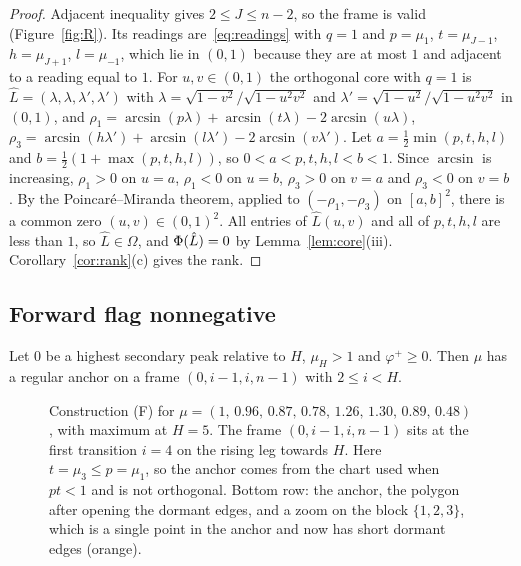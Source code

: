 \begin{proof}
Adjacent inequality gives $2\le J\le n-2$, so the frame is valid
(Figure~\ref{fig:R}). Its readings are~\eqref{eq:readings} with $q=1$ and
$p=\mu_1$, $t=\mu_{J-1}$, $h=\mu_{J+1}$, $l=\mu_{-1}$, which lie in $(0,1)$
because they are at most $1$ and adjacent to a reading equal to $1$. For
$u,v\in(0,1)$ the orthogonal core with $q=1$ is
$\hat L=(\lambda,\lambda,\lambda',\lambda')$ with
$\lambda=\sqrt{1-v^2}/\sqrt{1-u^2v^2}$ and $\lambda'=\sqrt{1-u^2}/\sqrt{1-u^2v^2}$
in $(0,1)$, and
$\rho_1=\arcsin(p\lambda)+\arcsin(t\lambda)-2\arcsin(u\lambda)$,
$\rho_3=\arcsin(h\lambda')+\arcsin(l\lambda')-2\arcsin(v\lambda')$. Let
$a=\frac12\min(p,t,h,l)$ and $b=\frac12(1+\max(p,t,h,l))$, so
$0<a<p,t,h,l<b<1$. Since $\arcsin$ is increasing, $\rho_1>0$ on $u=a$,
$\rho_1<0$ on $u=b$, $\rho_3>0$ on $v=a$ and $\rho_3<0$ on $v=b$. By the
Poincar\'e--Miranda theorem, applied to $(-\rho_1,-\rho_3)$ on $[a,b]^2$, there
is a common zero $(u,v)\in(0,1)^2$. All entries of $\hat L(u,v)$ and all of
$p,t,h,l$ are less than $1$, so $\hat L\in\Omega$, and $\Phi(\hat L)=0$ by
Lemma~\ref{lem:core}(iii). Corollary~\ref{cor:rank}(c) gives the rank.
\end{proof}

\subsection{Forward flag nonnegative}

\begin{proposition}[Statement (F)]\label{prop:F}
Let $0$ be a highest secondary peak relative to $H$, $\mu_H>1$ and
$\varphi^+\ge0$. Then $\mu$ has a regular anchor on a frame $(0,i-1,i,n-1)$
with $2\le i<H$.
\end{proposition}

\begin{figure}[t]
\centering
{}
\caption{Construction (F) for
$\mu=(1,\allowbreak\,0.96,\allowbreak\,0.87,\allowbreak\,0.78,\allowbreak\,1.26,\allowbreak\,1.30,\allowbreak\,0.89,\allowbreak\,0.48)$, with maximum at
$H=5$. The frame $(0,i-1,i,n-1)$ sits at the first transition $i=4$ on the
rising leg towards $H$. Here $t=\mu_3\le p=\mu_1$, so the anchor comes from
the chart used when $pt<1$ and is not orthogonal. Bottom row: the anchor, the polygon after
opening the dormant edges, and a zoom on the block $\{1,2,3\}$, which is a
single point in the anchor and now has short dormant edges (orange).}
\label{fig:F}
\end{figure}

